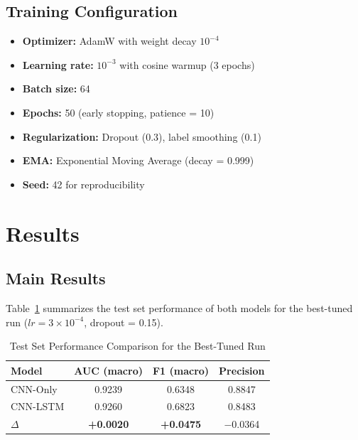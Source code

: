 \documentclass[conference]{IEEEtran}
\begin{document}
\subsection{Training Configuration}

\begin{itemize}
    \item \textbf{Optimizer:} AdamW with weight decay $10^{-4}$
    \item \textbf{Learning rate:} $10^{-3}$ with cosine warmup (3 epochs)
    \item \textbf{Batch size:} 64
    \item \textbf{Epochs:} 50 (early stopping, patience = 10)
    \item \textbf{Regularization:} Dropout (0.3), label smoothing (0.1)
    \item \textbf{EMA:} Exponential Moving Average (decay = 0.999)
    \item \textbf{Seed:} 42 for reproducibility
\end{itemize}

\section{Results}

\subsection{Main Results}

Table~\ref{tab:main_results} summarizes the test set performance of both models for the best-tuned run ($lr = 3\times10^{-4}$, dropout = 0.15).

\begin{table}[htbp]
\centering
\caption{Test Set Performance Comparison for the Best-Tuned Run}
\label{tab:main_results}
\begin{tabular}{lccc}
\toprule
\textbf{Model} & \textbf{AUC (macro)} & \textbf{F1 (macro)} & \textbf{Precision} \\
\midrule
CNN-Only & 0.9239 & 0.6348 & 0.8847 \\
CNN-LSTM & 0.9260 & 0.6823 & 0.8483 \\
\midrule
\textbf{$\Delta$} & \textbf{+0.0020} & \textbf{+0.0475} & $-$0.0364 \\
\bottomrule
\end{tabular}
\end{table}
\end{document}
